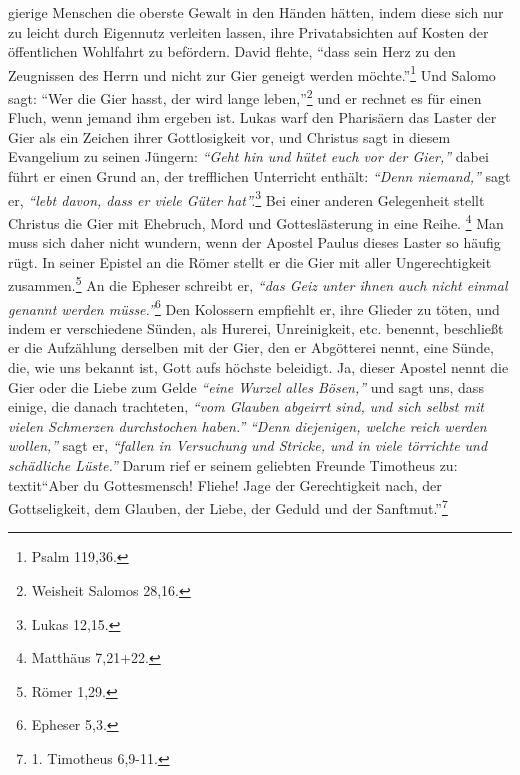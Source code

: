 gierige Menschen
die oberste Gewalt in den Händen hätten, indem diese sich nur zu leicht durch
Eigennutz verleiten lassen, ihre Privatabsichten auf Kosten der öffentlichen
Wohlfahrt zu befördern. David flehte,
"`dass sein Herz zu den Zeugnissen des
Herrn und nicht zur Gier geneigt werden möchte."'\footnote{Psalm 119,36.}
Und Salomo sagt: "`Wer die Gier hasst, der wird lange leben,"'\footnote{Weisheit Salomos 28,16.}
und er rechnet es für einen Fluch, wenn jemand ihm ergeben ist. Lukas
warf den Pharisäern das Laster der Gier als ein
Zeichen ihrer Gottlosigkeit
vor, und Christus sagt in diesem Evangelium zu seinen Jüngern:
\textit{"`Geht hin und
hütet euch vor der Gier,"'} dabei führt er einen Grund an, der trefflichen
Unterricht enthält: \textit{"`Denn niemand,"'} sagt er,
\textit{"`lebt davon, dass er viele Güter hat"'.}\footnote{Lukas 12,15.}
Bei einer anderen Gelegenheit stellt Christus die Gier mit Ehebruch, Mord und
Gotteslästerung in eine Reihe.
\footnote{Matthäus 7,21+22.}
Man muss sich daher nicht wundern, wenn der Apostel Paulus dieses
Laster so häufig rügt. In seiner Epistel an die Römer stellt er die Gier mit
aller Ungerechtigkeit zusammen.\footnote{Römer 1,29.}
An die Epheser schreibt er,
\textit{"`das Geiz unter ihnen auch nicht einmal genannt werden müsse."'}\footnote{Epheser 5,3.}
Den Kolossern empfiehlt er, ihre Glieder zu töten, und indem er
verschiedene Sünden, als Hurerei, Unreinigkeit, etc. benennt, beschließt er
die Aufzählung derselben mit der Gier, den er Abgötterei
nennt, eine Sünde,
die, wie uns bekannt ist, Gott aufs höchste beleidigt. Ja, dieser Apostel nennt
die Gier oder die Liebe zum Gelde \textit{"`eine Wurzel alles Bösen,"'}
 und sagt uns, dass
einige, die danach trachteten, \textit{"`vom Glauben abgeirrt sind, und sich
selbst
mit vielen Schmerzen durchstochen haben."'} \textit{"`Denn diejenigen, welche
reich
werden wollen,"'} sagt er, \textit{"`fallen in Versuchung und Stricke, und in
viele
törrichte und schädliche Lüste."'} Darum rief er seinem geliebten Freunde
Timotheus zu:\\textit{"`Aber du Gottesmensch! Fliehe! Jage der
Gerechtigkeit
nach, der Gottseligkeit, dem Glauben, der Liebe, der Geduld und der
Sanftmut."'}\footnote{1. Timotheus 6,9-11.}

